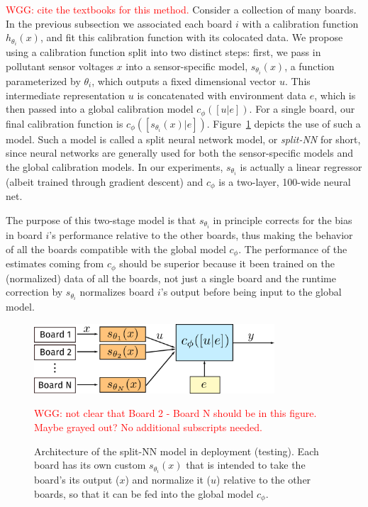 \documentclass[journal abbreviation, manuscript]{copernicus}
\newcommand\todo[1]{\textcolor{red}{#1}}
\begin{document}
\todo{WGG: cite the textbooks for this method.} Consider a collection of many boards. In the previous subsection we associated each board $i$ with a calibration function $h_{\theta_i}(x)$, and fit this calibration function with its colocated data.  We propose using a calibration function split into two distinct steps: first, we pass in pollutant sensor voltages $x$ into a sensor-specific model, $s_{\theta_i}(x)$, a function parameterized by $\theta_i$, which outputs a fixed dimensional vector $u$. This intermediate representation $u$ is concatenated with environment data $e$, which is then passed into a global calibration model $c_\phi([u | e])$. For a single board, our final calibration function is $c_\phi([s_{\theta_i}(x) | e])$.  Figure~\ref{fig:split-nn-deploy} depicts the use of such a model.  Such a model is called a split neural network model, or \textit{split-NN} for short, since neural networks are generally used for both the sensor-specific models and the global calibration models. In our experiments, $s_{\theta_i}$ is actually a linear regressor (albeit trained through gradient descent) and $c_\phi$ is a two-layer, 100-wide neural net. 

The purpose of this two-stage model is that $s_{\theta_i}$ in principle corrects for the bias in board $i$'s performance relative to the other boards, thus making the behavior of all the boards compatible with the global model $c_\phi$.  The performance of the estimates coming from $c_\phi$ should be superior because it been trained on the (normalized) data of all the boards, not just a single board and the runtime correction by $s_{\theta_i}$ normalizes board $i$'s output before being input to the global model.

\begin{figure}
    \includegraphics[width=0.8\textwidth]{writeup/img/split-model.png}
    \caption{Architecture of the split-NN model in deployment (testing).  Each board has its own custom $s_{\theta_i}(x)$ that is intended to take the board's its output ($x$) and normalize it ($u$) relative to the other boards, so that it can be fed into the global model $c_\phi$.}
    \label{fig:split-nn-deploy}
    \todo{WGG: not clear that Board 2 - Board N should be in this figure.  Maybe grayed out?  No additional subscripts needed.}
\end{figure}
\end{document}

